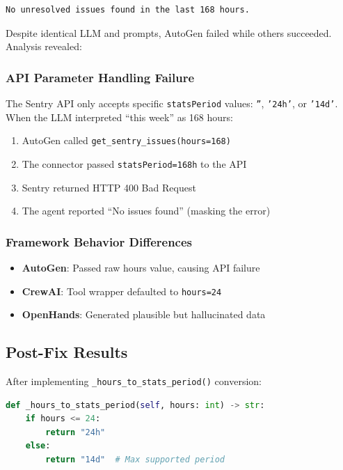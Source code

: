 \documentclass[11pt,a4paper]{article}
\begin{document}
\begin{lstlisting}[language=bash]
No unresolved issues found in the last 168 hours.
\end{lstlisting}

Despite identical LLM and prompts, AutoGen failed while others succeeded. Analysis revealed:

\subsubsection{API Parameter Handling Failure}

The Sentry API only accepts specific \texttt{statsPeriod} values: \texttt{''}, \texttt{'24h'}, or \texttt{'14d'}. When the LLM interpreted ``this week'' as 168 hours:

\begin{enumerate}
    \item AutoGen called \texttt{get\_sentry\_issues(hours=168)}
    \item The connector passed \texttt{statsPeriod=168h} to the API
    \item Sentry returned HTTP 400 Bad Request
    \item The agent reported ``No issues found'' (masking the error)
\end{enumerate}

\subsubsection{Framework Behavior Differences}

\begin{itemize}
    \item \textbf{AutoGen}: Passed raw hours value, causing API failure
    \item \textbf{CrewAI}: Tool wrapper defaulted to \texttt{hours=24}
    \item \textbf{OpenHands}: Generated plausible but hallucinated data
\end{itemize}

\subsection{Post-Fix Results}

After implementing \texttt{\_hours\_to\_stats\_period()} conversion:

\begin{lstlisting}[language=Python]
def _hours_to_stats_period(self, hours: int) -> str:
    if hours <= 24:
        return "24h"
    else:
        return "14d"  # Max supported period
\end{lstlisting}
\end{document}
